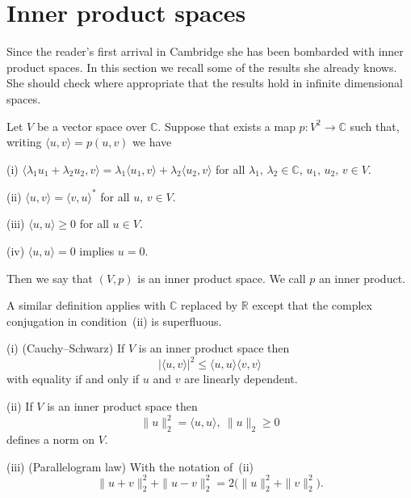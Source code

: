 \section{Inner product spaces} Since the reader's first arrival 
in Cambridge she has been bombarded with inner product spaces.
In this section we recall some of the results she already knows.
She should check where appropriate that the results hold
in infinite dimensional spaces.
\begin{definition} Let $V$ be a vector space over ${\mathbb C}$.
Suppose that exists a map $p:V^{2}\rightarrow{\mathbb C}$
such that, writing $\langle u,v\rangle=p(u,v)$
we have

(i) $\langle\lambda_{1} u_{1}+\lambda_{2} u_{2},v\rangle
= \lambda_{1}\langle u_{1},v\rangle
+\lambda_{2}\langle u_{2},v\rangle$
for all $\lambda_{1},\,\lambda_{2}\in{\mathbb C}$,
$u_{1},\,u_{2},\,v\in V$.

(ii) $\langle u,v\rangle=\langle v,u\rangle^{*}$
for all $u,\,v\in V$.

(iii) $\langle u,u\rangle\geq 0$ for all $u\in V$.

(iv) $\langle u,u\rangle=0$ implies $u=0$.

Then we say that $(V,p)$ is an inner product space. 
We call $p$ an inner product.
\end{definition}
A similar definition applies with ${\mathbb C}$ replaced by ${\mathbb R}$
except that the complex conjugation in
condition~(ii) is superfluous.
\begin{exercise}\label{E;inner product norm} 
(i) (Cauchy--Schwarz)
If $V$ is an inner product space
then
\[|\langle u,v\rangle|^{2}\leq \langle u,u\rangle\langle v,v\rangle\]
with equality if and only if $u$ and $v$ are linearly dependent.

(ii) If $V$ is an inner product space then
\[\|u\|_{2}^{2}=\langle u,u\rangle,\ \|u\|_{2}\geq 0\]
defines a norm on $V$.

(iii) (Parallelogram law)
With the notation of~(ii)
\[\|u+v\|_{2}^{2}+\|u-v\|_{2}^{2}=2\big(\|u\|_{2}^{2}+\|v\|_{2}^{2}).\]
\end{exercise}

